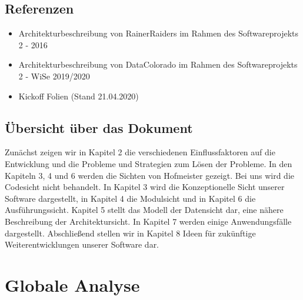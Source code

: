 \documentclass[fontsize=12pt,paper=a4,twoside]{scrartcl}
\begin{document}
\subsection{Referenzen}

\begin{itemize}
\item{Architekturbeschreibung von RainerRaiders im Rahmen des Softwareprojekts 2 - 2016}
\item{Architekturbeschreibung von DataColorado im Rahmen des Softwareprojekts 2 - WiSe 2019/2020}
\item{Kickoff Folien (Stand 21.04.2020)}
\end{itemize}

\subsection{Übersicht über das Dokument}

Zunächst zeigen wir in Kapitel 2 die verschiedenen Einflussfaktoren auf die Entwicklung und die Probleme und Strategien zum Lösen der Probleme. In den Kapiteln 3, 4 und 6 werden die Sichten von Hofmeister gezeigt. Bei uns wird die Codesicht nicht behandelt. In Kapitel 3 wird die Konzeptionelle Sicht unserer Software dargestellt, in Kapitel 4 die Modulsicht und in Kapitel 6 die Ausführungssicht. Kapitel 5 stellt das Modell der Datensicht dar, eine nähere Beschreibung der Architektursicht. In Kapitel 7 werden einige Anwendungsfälle dargestellt. Abschließend stellen wir in Kapitel 8 Ideen für zukünftige Weiterentwicklungen unserer Software dar. 


\section{Globale Analyse} \label{sec:globale_analyse}


\end{document}
